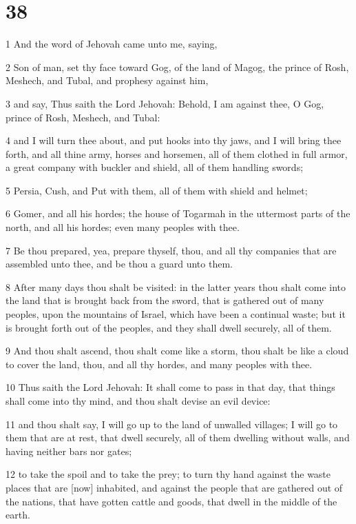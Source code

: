 \chapter{38}

\par 1 And the word of Jehovah came unto me, saying,
\par 2 Son of man, set thy face toward Gog, of the land of Magog, the prince of Rosh, Meshech, and Tubal, and prophesy against him,
\par 3 and say, Thus saith the Lord Jehovah: Behold, I am against thee, O Gog, prince of Rosh, Meshech, and Tubal:
\par 4 and I will turn thee about, and put hooks into thy jaws, and I will bring thee forth, and all thine army, horses and horsemen, all of them clothed in full armor, a great company with buckler and shield, all of them handling swords;
\par 5 Persia, Cush, and Put with them, all of them with shield and helmet;
\par 6 Gomer, and all his hordes; the house of Togarmah in the uttermost parts of the north, and all his hordes; even many peoples with thee.
\par 7 Be thou prepared, yea, prepare thyself, thou, and all thy companies that are assembled unto thee, and be thou a guard unto them.
\par 8 After many days thou shalt be visited: in the latter years thou shalt come into the land that is brought back from the sword, that is gathered out of many peoples, upon the mountains of Israel, which have been a continual waste; but it is brought forth out of the peoples, and they shall dwell securely, all of them.
\par 9 And thou shalt ascend, thou shalt come like a storm, thou shalt be like a cloud to cover the land, thou, and all thy hordes, and many peoples with thee.
\par 10 Thus saith the Lord Jehovah: It shall come to pass in that day, that things shall come into thy mind, and thou shalt devise an evil device:
\par 11 and thou shalt say, I will go up to the land of unwalled villages; I will go to them that are at rest, that dwell securely, all of them dwelling without walls, and having neither bars nor gates;
\par 12 to take the spoil and to take the prey; to turn thy hand against the waste places that are [now] inhabited, and against the people that are gathered out of the nations, that have gotten cattle and goods, that dwell in the middle of the earth.
